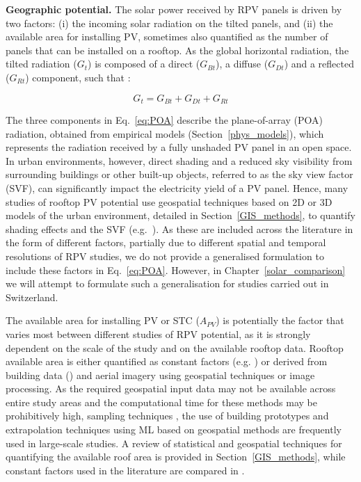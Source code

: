 \textbf{Geographic potential.} The solar power received by RPV panels is driven by two factors: (i) the incoming solar radiation on the tilted panels, and (ii) the available area for installing PV, sometimes also quantified as the number of panels that can be installed on a rooftop. As the global horizontal radiation, the tilted radiation ($G_t$) is composed of a direct ($G_{Bt}$), a diffuse ($G_{Dt}$) and a reflected ($G_{Rt}$) component, such that \cite{assouline_estimation_2017}:

\begin{equation}
\label{eq:POA}
G_{t} = G_{Bt} + G_{Dt} + G_{Rt}
\end{equation}

The three components in Eq.~\ref{eq:POA} describe the plane-of-array (POA) radiation, obtained from empirical models (Section~\ref{phys_models}), which represents the radiation received by a fully unshaded PV panel in an open space. 
In urban environments, however, direct shading and a reduced sky visibility from surrounding buildings or other built-up objects, referred to as the sky view factor (SVF), can significantly impact the electricity yield of a PV panel. 
Hence, many studies of rooftop PV potential use geospatial techniques based on 2D or 3D models of the urban environment, detailed in Section~\ref{GIS_methods}, to quantify shading effects and the SVF (e.g.~\cite{desthieux_solar_2018,calcabrini_simplified_2019,wegertseder_combining_2016,jakubiec_method_2013}).
As these are included across the literature in the form of different factors, partially due to different spatial and temporal resolutions of RPV studies, we do not provide a generalised formulation to include these factors in Eq.~\ref{eq:POA}. However, in Chapter~\ref{solar_comparison} we will attempt to formulate such a generalisation for studies carried out in Switzerland.

The available area for installing PV or STC ($A_{PV}$) is potentially the factor that varies most between different studies of RPV potential, as it is strongly dependent on the scale of the study and on the available rooftop data. 
Rooftop available area is either quantified as constant factors (e.g. \cite{iea_potential_2002,wegertseder_combining_2016,portmann_sonnendach.ch:_2016}) or derived from building data (\cite{ramirez_camargo_spatio-temporal_2015,assouline_quantifying_2017,hong_development_2017}) and aerial imagery \cite{mainzer_assessment_2017} using geospatial techniques or image processing. 
As the required geospatial input data may not be available across entire study areas and the computational time for these methods may be prohibitively high, sampling techniques \cite{izquierdo_method_2008}, the use of building prototypes \cite{wegertseder_combining_2016} and extrapolation techniques using ML \cite{assouline_quantifying_2017,assouline_large-scale_2018} based on geospatial methods are frequently used in large-scale studies. 
A review of statistical and geospatial techniques for quantifying the available roof area is provided in Section~\ref{GIS_methods}, while constant factors used in the literature are compared in \cite{assouline_estimation_2017,wiginton_quantifying_2010,singh_estimation_2015}.

